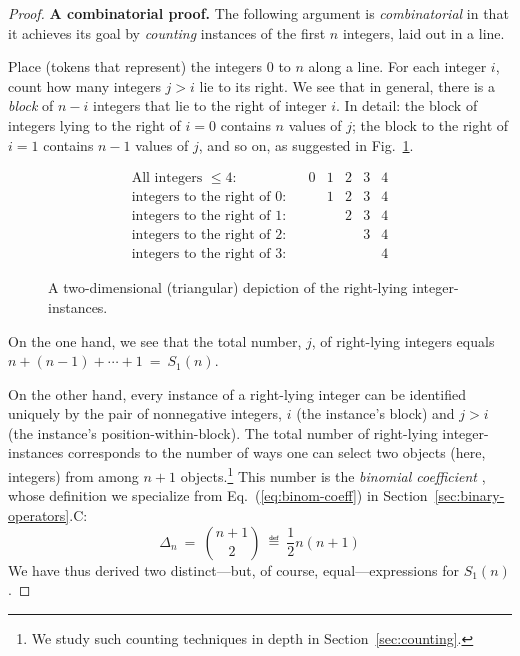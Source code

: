 \begin{proof}
{\bf A combinatorial proof.}
The following argument is {\it combinatorial} in that it achieves its goal by {\em counting} instances of the first $n$ integers, laid out in a line.

\smallskip

Place (tokens that represent) the integers $0$ to $n$ along a line.  For each integer $i$, count how many integers $j > i$ lie to its right.  We see that in general, there is a {\it block} of $n-i$ integers that lie to the right of integer $i$.  In detail: the block of integers lying to the right of $i=0$ contains $n$ values of $j$; the block to the right of $i=1$ contains $n-1$ values of $j$, and so on, as suggested in Fig.~\ref{fig:rightward-instances}.
\begin{figure}[htb]
\[
\begin{array}{lcccccc}
\mbox{All integers $\leq 4$:} &
 & 0 & 1 & 2 & 3 & 4 \\
\mbox{integers to the right of $0$:} &
 &   & 1 & 2 & 3 & 4 \\
\mbox{integers to the right of $1$:} &
 &   &   & 2 & 3 & 4 \\
\mbox{integers to the right of $2$:} &
 &   &   &   & 3 & 4 \\
\mbox{integers to the right of $3$:} &
 &   &   &   &   & 4
\end{array}
\]
\caption{A two-dimensional (triangular) depiction of the right-lying integer-instances.}
\label{fig:rightward-instances}
\end{figure}

\smallskip

On the one hand, we see that the total number, $j$, of right-lying integers equals $n+(n-1)+ \cdots + 1 \ = \ S_1(n)$.

\smallskip

On the other hand, every instance of a right-lying integer can be identified uniquely by the pair of nonnegative integers, $i$ (the instance's block) and $j>i$ (the instance's position-within-block).
The total number of right-lying integer-instances corresponds to the number of ways one can select two objects (here, integers) from among $n+1$ objects.\footnote{We study such counting techniques in depth in Section~\ref{sec:counting}.}  This number is the {\it binomial coefficient }, whose definition we specialize from Eq.~(\ref{eq:binom-coeff}) in Section~\ref{sec:binary-operators}.C:
\[
\Delta_n  \ = \  {{n+1} \choose 2}  \  \eqdef  \  \frac{1}{2} n(n+1)
\]
We have thus derived two distinct---but, of course, equal---expressions for $S_1(n)$.
\end{proof}

